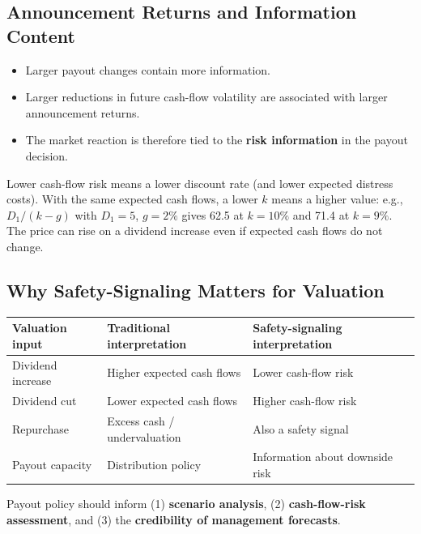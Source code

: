 \subsection{Announcement Returns and Information Content}
\begin{itemize}
  \item Larger payout changes contain more information.
  \item Larger reductions in future cash-flow volatility are associated with larger announcement returns.
  \item The market reaction is therefore tied to the \textbf{risk information} in the payout decision.
\end{itemize}
\begin{addbox}
Lower cash-flow risk means a lower discount rate (and lower expected distress costs). With the same expected cash flows, a lower $k$ means a higher value: e.g., $D_1/(k-g)$ with $D_1=5$, $g=2\%$ gives 62.5 at $k=10\%$ and 71.4 at $k=9\%$. The price can rise on a dividend increase even if expected cash flows do not change.
\end{addbox}

\subsection{Why Safety-Signaling Matters for Valuation}

\begin{center}
\small
\begin{tabular}{@{}lll@{}}
\toprule
\textbf{Valuation input} & \textbf{Traditional interpretation} & \textbf{Safety-signaling interpretation}\\
\midrule
Dividend increase & Higher expected cash flows & Lower cash-flow risk\\
Dividend cut & Lower expected cash flows & Higher cash-flow risk\\
Repurchase & Excess cash / undervaluation & Also a safety signal\\
Payout capacity & Distribution policy & Information about downside risk\\
\bottomrule
\end{tabular}
\end{center}
\begin{keybox}
Payout policy should inform (1) \textbf{scenario analysis}, (2) \textbf{cash-flow-risk assessment}, and (3) the \textbf{credibility of management forecasts}.
\end{keybox}


